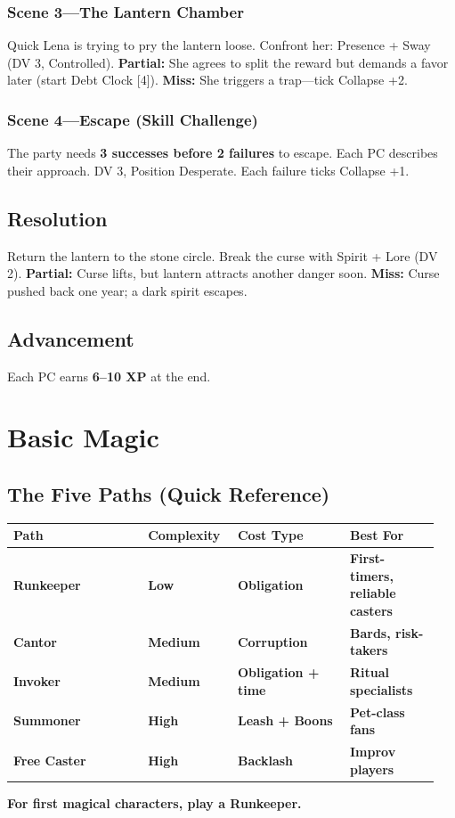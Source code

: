 \documentclass[10pt]{article}
\begin{document}
\subsubsection{Scene 3—The Lantern Chamber}
Quick Lena is trying to pry the lantern loose. Confront her: Presence + Sway (DV 3, Controlled). \textbf{Partial:} She agrees to split the reward but demands a favor later (start Debt Clock [4]). \textbf{Miss:} She triggers a trap—tick Collapse +2.

\subsubsection{Scene 4—Escape (Skill Challenge)}
The party needs \textbf{3 successes before 2 failures} to escape. Each PC describes their approach. DV 3, Position Desperate. Each failure ticks Collapse +1.

\subsection{Resolution}
Return the lantern to the stone circle. Break the curse with Spirit + Lore (DV 2). \textbf{Partial:} Curse lifts, but lantern attracts another danger soon. \textbf{Miss:} Curse pushed back one year; a dark spirit escapes.

\subsection{Advancement}
Each PC earns \textbf{6–10 XP} at the end.

\section{Basic Magic}

\subsection{The Five Paths (Quick Reference)}
\begin{coretable}
\begin{tabular}{>{\bfseries}p{0.3\linewidth} >{\bfseries}p{0.2\linewidth} >{\bfseries}p{0.25\linewidth} >{\bfseries}p{0.2\linewidth}}
\toprule
\textbf{Path} & \textbf{Complexity} & \textbf{Cost Type} & \textbf{Best For} \\
\midrule
Runkeeper & Low & Obligation & First-timers, reliable casters \\
Cantor & Medium & Corruption & Bards, risk-takers \\
Invoker & Medium & Obligation + time & Ritual specialists \\
Summoner & High & Leash + Boons & Pet-class fans \\
Free Caster & High & Backlash & Improv players \\
\bottomrule
\end{tabular}
\end{coretable}
\textbf{For first magical characters, play a Runkeeper.}
\end{document}
